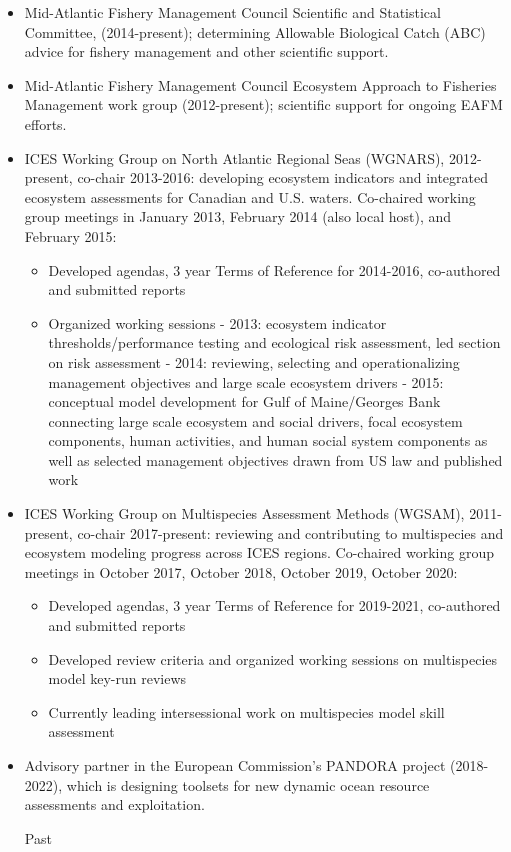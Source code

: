 \documentclass[11pt, a4paper]{awesome-cv}
\providecommand{\tightlist}{%
	\setlength{\itemsep}{0pt}\setlength{\parskip}{0pt}}
\begin{document}
\begin{itemize}
\item
  Mid-Atlantic Fishery Management Council Scientific and Statistical
  Committee, (2014-present); determining Allowable Biological Catch
  (ABC) advice for fishery management and other scientific support.
\item
  Mid-Atlantic Fishery Management Council Ecosystem Approach to
  Fisheries Management work group (2012-present); scientific support for
  ongoing EAFM efforts.
\item
  ICES Working Group on North Atlantic Regional Seas (WGNARS),
  2012-present, co-chair 2013-2016: developing ecosystem indicators and
  integrated ecosystem assessments for Canadian and U.S. waters.
  Co-chaired working group meetings in January 2013, February 2014 (also
  local host), and February 2015:

  \begin{itemize}
  \tightlist
  \item
    Developed agendas, 3 year Terms of Reference for 2014-2016,
    co-authored and submitted reports
  \item
    Organized working sessions - 2013: ecosystem indicator
    thresholds/performance testing and ecological risk assessment, led
    section on risk assessment - 2014: reviewing, selecting and
    operationalizing management objectives and large scale ecosystem
    drivers - 2015: conceptual model development for Gulf of
    Maine/Georges Bank connecting large scale ecosystem and social
    drivers, focal ecosystem components, human activities, and human
    social system components as well as selected management objectives
    drawn from US law and published work
  \end{itemize}
\item
  ICES Working Group on Multispecies Assessment Methods (WGSAM),
  2011-present, co-chair 2017-present: reviewing and contributing to
  multispecies and ecosystem modeling progress across ICES regions.
  Co-chaired working group meetings in October 2017, October 2018,
  October 2019, October 2020:

  \begin{itemize}
  \tightlist
  \item
    Developed agendas, 3 year Terms of Reference for 2019-2021,
    co-authored and submitted reports
  \item
    Developed review criteria and organized working sessions on
    multispecies model key-run reviews
  \item
    Currently leading intersessional work on multispecies model skill
    assessment
  \end{itemize}
\item
  Advisory partner in the European Commission's PANDORA project
  (2018-2022), which is designing toolsets for new dynamic ocean
  resource assessments and exploitation.

  Past
\end{itemize}
\end{document}

